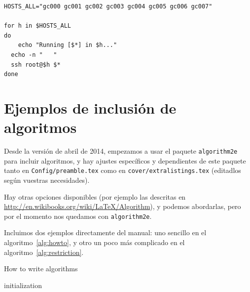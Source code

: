 \documentclass[spanish,openright]{book}
\begin{document}
\begin{appendices}
\begin{lstlisting}[style=BashInputStyle, numbers=none]
HOSTS_ALL="gc000 gc001 gc002 gc003 gc004 gc005 gc006 gc007"

for h in $HOSTS_ALL
do
	echo "Running [$*] in $h..."
  echo -n "   "
  ssh root@$h $*
done
\end{lstlisting}


\section{Ejemplos de inclusión de algoritmos}
\label{sec:algoritmos}

Desde la versión de abril de 2014, empezamos a usar el paquete
\texttt{algorithm2e} para incluir algoritmos, y hay ajustes específicos
y dependientes de este paquete tanto en \texttt{Config/preamble.tex}
como en \texttt{cover/extralistings.tex} (editadlos según vuestras
necesidades). 

Hay otras opciones disponibles (por ejemplo las descritas en
\url{http://en.wikibooks.org/wiki/LaTeX/Algorithm}), y podemos
abordarlas, pero por el momento nos quedamos con \texttt{algorithm2e}.

Incluimos dos ejemplos directamente del manual: uno sencillo en el
algoritmo~\ref{alg:howto}, y otro un poco más complicado en el
algoritmo~\ref{alg:restriction}.

\begin{algorithm}[H]
 \caption{How to write algorithms}
 \label{alg:howto}
 initialization\;
\end{algorithm}



\end{appendices}
\end{document}
